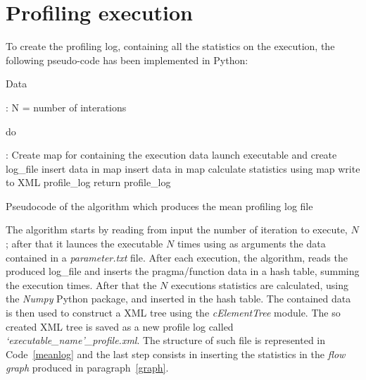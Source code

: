 \documentclass[a4paper,11pt,oneside]{book}
\begin{document}
\section{Profiling execution}

To create the profiling log, containing all the statistics on the execution, the following pseudo-code has been implemented in Python:

\begin{algorithm}[H]
\begin{algorithmic}
 \State \begin{bf}Data\end{bf}:{ N = number of interations}
\State \begin{bf}do\end{bf}: Create map for containing the execution data
\State launch executable and create log\_file
\State insert data in map
\EndFor
{}
\State insert data in map
\EndFor
\EndFor
\State calculate statistics using map\;
\State write to XML profile\_log
\EndFor
\State return profile\_log
\end{algorithmic}
\caption{Pseudocode of the algorithm which produces the mean profiling log file}
\end{algorithm}

The algorithm starts by reading from input the number of iteration to execute, $N$; after that it launces the executable $N$ times using as arguments the data contained in a \emph{parameter.txt} file. After each execution, the algorithm, reads the produced log\_file and inserts the pragma/function data in a hash table, summing the execution times. After that the $N$ executions statistics are calculated, using the \emph{Numpy} Python package, and inserted in the hash table. The contained data is then used to construct a XML tree using the \emph{cElementTree} module. The so created XML tree is saved as a new profile log called \emph{`executable\_name'\_profile.xml}. The structure of such file is represented in Code~\ref{meanlog} and the last step consists in inserting the statistics in the \emph{flow graph} produced in paragraph~\ref{graph}.
\end{document}
